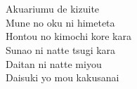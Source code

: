 \begin{multicols}{2}
\\
\\
Akuariumu de  kizuite\\
Mune no oku ni himeteta \\
Hontou no kimochi kore kara\\
Sunao ni natte tsugi kara\\
Daitan ni natte miyou\\
Daisuki yo mou kakusanai \\

\\
\end{multicols}

\ifdefined\COMPLETE
\else
	
\fi
